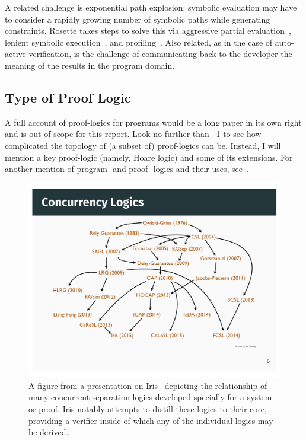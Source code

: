 A related challenge is exponential path explosion: symbolic evaluation may have
to consider a rapidly growing number of symbolic paths while generating
constraints. Rosette takes steps to solve this via aggressive partial
evaluation~\cite{Torlak_2013,Torlak_2014}, lenient symbolic
execution~\cite{Chang_2018}, and
profiling~\cite{Bornholt_2018,Porncharoenwase_2020}. Also related, as in the
case of auto-active verification, is the challenge of communicating back to the
developer the meaning of the results in the program domain.

\subsection{Type of Proof Logic}\label{S:t_logic}

A full account of proof-logics for programs would be a long paper in its own
right and is out of scope for this report. Look no further than
\figurename~\ref{F:iris_complex} to see how complicated the topology of (a
subset of) proof-logics can be. Instead, I will mention a key proof-logic
(namely, Hoare logic) and some of its extensions. For another mention of
program- and proof- logics and their uses, see~\cite[\S 5]{Appel_2011}.

\begin{figure}
    \centering
    \includegraphics[width=\textwidth]{img/iris_2_0_concurrent_logics}
    \caption{A figure from a presentation on Iris~\cite{Jung_2016_slides}
    depicting the relationship of many concurrent separation logics developed
    specially for a system or proof. Iris notably attempts to distill these
    logics to their core, providing a verifier inside of which any of the
    individual logics may be derived.}\label{F:iris_complex}
\end{figure}

